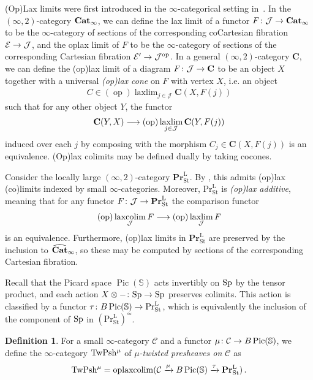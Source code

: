 \documentclass[10pt]{amsart}
\numberwithin{equation}{section}
\theoremstyle{definition}
\newtheorem{definition}[prop]{Definition}
\DeclareMathOperator{\Pic}{Pic}
\DeclareMathOperator{\op}{op}
\DeclareMathOperator{\St}{St}
\DeclareMathOperator*{\laxcolim}{laxcolim}
\DeclareMathOperator*{\laxlim}{laxlim}
\DeclareMathOperator*{\oplaxcolim}{oplaxcolim}
\renewcommand{\Pr}{\mathrm{Pr}}
\newcommand{\bfPr}{\mathbf{Pr}}
\newcommand{\rL}{\mathrm{L}}
\newcommand{\PrLSt}{\Pr^{\rL}_{\St}}
\newcommand{\TwShv}{\mathrm{TwPsh}\vphantom{h}}
\newcommand{\bfCat}{\mathbf{Cat}\vphantom{t}}
\newcommand{\bS}{\mathbb{S}}
\newcommand{\cC}{\mathcal{C}}
\newcommand{\cE}{\mathcal{E}}
\newcommand{\cJ}{\mathcal{J}}
\newcommand{\bfC}{\mathbf{C}}
\newcommand{\Sp}{\mathrm{Sp}\vphantom{p}}
\renewcommand{\to}{\mathchoice{\longrightarrow}{\rightarrow}{}{}}
\begin{document}
(Op)Lax limits were first introduced in the $\infty$-categorical setting in~\cite{GHN}.
In the $(\infty,2)$-category $\bfCat_{\infty}$, we can define the lax limit of a functor $F\colon \cJ \to \bfCat_{\infty}$ to be the $\infty$-category of sections of the corresponding coCartesian fibration $\cE \to \cJ$, and the oplax limit of $F$ to be the $\infty$-category of sections of the corresponding Cartesian fibration $\cE'\to \cJ^{\op}$.
In a general $(\infty,2)$-category $\bfC$, we can define the (op)lax limit of a diagram $F\colon \cJ \to \bfC$ to be an object $X$ together with a universal \emph{(op)lax cone} on $F$ with vertex $X$, i.e. an object
\begin{align*}
	C\in (\op)\laxlim_{j\in \cJ} \bfC(X, F(j))
\end{align*}
such that for any other object $Y$, the functor
\begin{align*}
	\bfC(Y,X) \to (\op)\laxlim_{j\in \cJ} \bfC(Y,F(j))
\end{align*}
induced over each $j$ by composing with the morphism $C_{j}\in \bfC(X,F(j))$ is an equivalence. (Op)lax colimits may be defined dually by taking cocones.

Consider the locally large $(\infty,2)$-category $\bfPr^{\rL}_{\St}$.
By \cite[Corollary 4.15, Example 5.7]{CDW}, this admits (op)lax (co)limits indexed by small $\infty$-categories.
Moreover, $\PrLSt$ is \emph{(op)lax additive}, meaning that for any functor $F\colon \cJ \to \bfPr^{\rL}_{\St}$ the comparison functor
\begin{align*}
	(\op)\laxcolim_{\cJ} F \to (\op)\laxlim_{\cJ} F
\end{align*}
is an equivalence.
Furthermore, (op)lax limits in $\bfPr^{\rL}_{\St}$ are preserved by the inclusion to $\widehat{\bfCat}_{\infty}$, so these may be computed by sections of the corresponding Cartesian fibration.


Recall that the Picard space $\Pic(\bS)$ acts invertibly on $\Sp$ by the tensor product, and each action $X\otimes - \colon \Sp \to \Sp$ preserves colimits.
This action is classified by a functor $\tau \colon B\Pic(\bS) \to \PrLSt$, which is equivalently the inclusion of the component of $\Sp$ in $(\PrLSt)^{\simeq}$.

\begin{definition}\label{def:twisted_presheaves}
	For a small $\infty$-category $\cC$ and a functor $\mu \colon \cC \to B \Pic(\bS)$, we define the $\infty$-category $\TwShv^{\mu}$ of \emph{$\mu$-twisted presheaves on $\cC$}  as
	\[
	\TwShv^\mu = \oplaxcolim(\cC \xrightarrow{\mu} B\Pic(\bS) \xrightarrow{\tau} \bfPr^{\rL}_{\St}) \,.
	\]
\end{definition}
\end{document}
